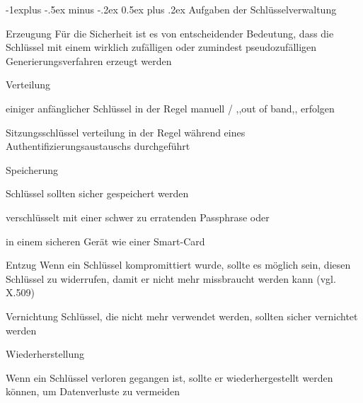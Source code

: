 \documentclass[a4paper]{article}
\makeatletter
\renewcommand{\subsection}{\@startsection{subsection}{2}{0mm}%
 {-1explus -.5ex minus -.2ex}%
 {0.5ex plus .2ex}%
 {\normalfont\normalsize\bfseries}}
\makeatother
\begin{document}
\begin{multicols}{3}
      \subsection{Aufgaben der Schlüsselverwaltung}
      \begin{description*}
            \item[Erzeugung] Für die Sicherheit ist es von entscheidender Bedeutung, dass die Schlüssel mit einem wirklich zufälligen oder zumindest pseudozufälligen Generierungsverfahren erzeugt werden
            \item[Verteilung]
            \begin{itemize*}
                  \item einiger anfänglicher Schlüssel in der Regel manuell / ,,out of band,, erfolgen
                  \item Sitzungsschlüssel verteilung in der Regel während eines Authentifizierungsaustauschs durchgeführt
            \end{itemize*}
            \item[Speicherung]
            \begin{itemize*}
                  \item Schlüssel sollten sicher gespeichert werden
                  \item verschlüsselt mit einer schwer zu erratenden Passphrase oder
                  \item in einem sicheren Gerät wie einer Smart-Card
            \end{itemize*}
            \item[Entzug] Wenn ein Schlüssel kompromittiert wurde, sollte es möglich sein, diesen Schlüssel zu widerrufen, damit er nicht mehr missbraucht werden kann (vgl. X.509)
            \item[Vernichtung] Schlüssel, die nicht mehr verwendet werden, sollten sicher vernichtet werden
            \item[Wiederherstellung]
            \begin{itemize*}
                  \item Wenn ein Schlüssel verloren gegangen ist, sollte er wiederhergestellt werden können, um Datenverluste zu vermeiden

\end{itemize*}
\end{description*}
\end{multicols}
\end{document}
